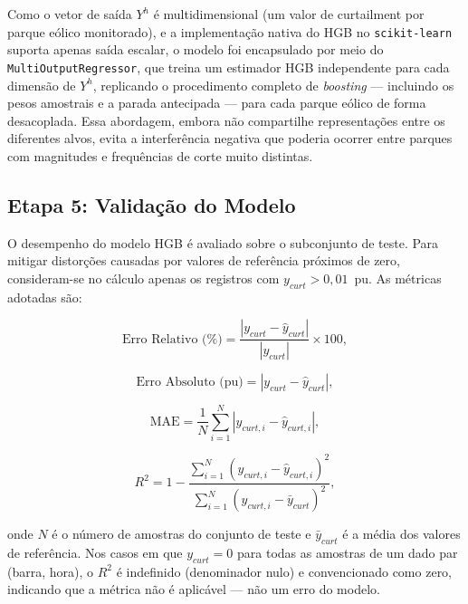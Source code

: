 \documentclass[conference]{IEEEtran}
\begin{document}
Como o vetor de saída $Y^h$ é multidimensional (um valor de curtailment
por parque eólico monitorado), e a implementação nativa do HGB no
\texttt{scikit-learn} suporta apenas saída escalar, o modelo foi
encapsulado por meio do \texttt{MultiOutputRegressor}, que treina um
estimador HGB independente para cada dimensão de $Y^h$, replicando o
procedimento completo de \textit{boosting} — incluindo os pesos amostrais
e a parada antecipada — para cada parque eólico de forma desacoplada.
Essa abordagem, embora não compartilhe representações entre os diferentes
alvos, evita a interferência negativa que poderia ocorrer entre parques
com magnitudes e frequências de corte muito distintas.

\subsection{Etapa 5: Validação do Modelo}

O desempenho do modelo HGB é avaliado sobre o subconjunto de teste. Para mitigar distorções causadas por
valores de referência próximos de zero, consideram-se no cálculo apenas
os registros com $y_{curt} > 0{,}01$~pu. As métricas adotadas são:

\begin{equation}
\text{Erro Relativo (\%)} =
    \frac{|y_{curt} - \hat{y}_{curt}|}{|y_{curt}|} \times 100,
\label{eq:erro_rel}
\end{equation}

\begin{equation}
\text{Erro Absoluto (pu)} =
    |y_{curt} - \hat{y}_{curt}|,
\label{eq:erro_abs}
\end{equation}

\begin{equation}
\text{MAE} =
    \frac{1}{N}\sum_{i=1}^{N}|y_{curt,i} - \hat{y}_{curt,i}|,
\label{eq:mae}
\end{equation}

\begin{equation}
R^2 = 1 - \frac{\displaystyle\sum_{i=1}^{N}(y_{curt,i} - \hat{y}_{curt,i})^2}
               {\displaystyle\sum_{i=1}^{N}(y_{curt,i} - \bar{y}_{curt})^2},
\label{eq:r2}
\end{equation}

\noindent onde $N$ é o número de amostras do conjunto de teste e
$\bar{y}_{curt}$ é a média dos valores de referência. Nos casos em que
$y_{curt} = 0$ para todas as amostras de um dado par (barra, hora),
o $R^2$ é indefinido (denominador nulo) e convencionado como zero,
indicando que a métrica não é aplicável — não um erro do modelo.
\end{document}
